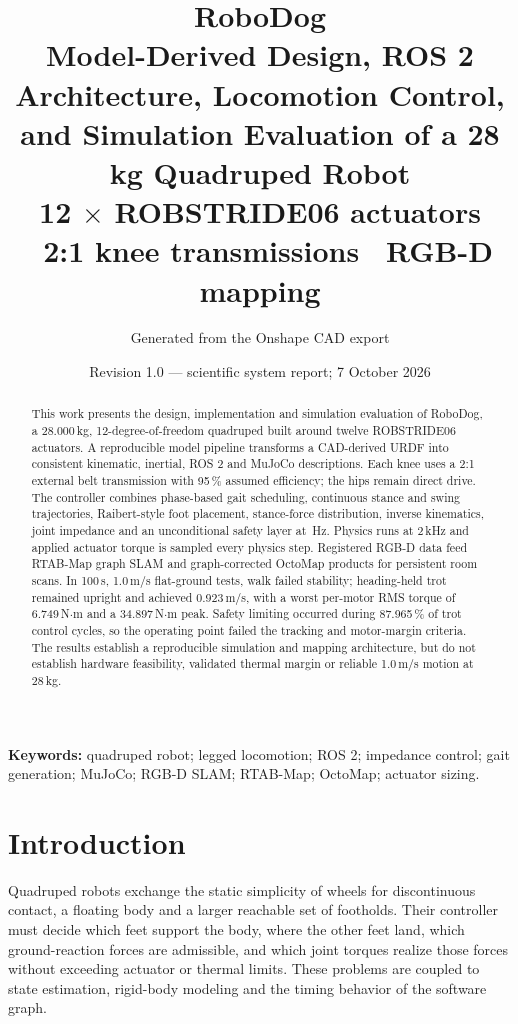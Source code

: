 \documentclass[11pt,a4paper]{article}
\title{\vspace{-12mm}\textbf{RoboDog}\\[2mm]
\large Model-Derived Design, ROS 2 Architecture, Locomotion Control,\\
and Simulation Evaluation of a 28 kg Quadruped Robot\\[1mm]
\normalsize 12 $\times$ ROBSTRIDE06 actuators \textbullet\ 2:1 knee transmissions
\textbullet\ RGB-D mapping}
\author{\small Generated from the Onshape CAD export \texttt{\RdCadSha}}
\date{\small Revision 1.0 --- scientific system report; 7 October 2026}
\begin{document}
\maketitle
\vspace{-6mm}

\begin{abstract}\noindent\small
This work presents the design, implementation and simulation evaluation of
RoboDog, a 28.000\,kg, 12-degree-of-freedom quadruped built around twelve
ROBSTRIDE06 actuators. A reproducible model pipeline transforms a CAD-derived
URDF into consistent kinematic, inertial, ROS 2 and MuJoCo descriptions. Each
knee uses a 2:1 external belt transmission with 95\,\% assumed efficiency; the
hips remain direct drive. The controller combines phase-based gait scheduling,
continuous stance and swing trajectories, Raibert-style foot placement,
stance-force distribution, inverse kinematics, joint impedance and an
unconditional safety layer at \RdControlRate\,Hz. Physics runs at 2\,kHz and
applied actuator torque is sampled every physics step. Registered RGB-D data
feed RTAB-Map graph SLAM and graph-corrected OctoMap products for persistent
room scans. In 100\,s, 1.0\,m/s flat-ground tests, walk failed stability;
heading-held trot remained upright and achieved 0.923\,m/s, with a worst
per-motor RMS torque of 6.749\,N$\cdot$m and a 34.897\,N$\cdot$m peak. Safety
limiting occurred during 87.965\,\% of trot control cycles, so the operating
point failed the tracking and motor-margin criteria. The results establish a
reproducible simulation and mapping architecture, but do not establish
hardware feasibility, validated thermal margin or reliable 1.0\,m/s motion at
28\,kg.
\end{abstract}

\noindent\textbf{Keywords:} quadruped robot; legged locomotion; ROS 2;
impedance control; gait generation; MuJoCo; RGB-D SLAM; RTAB-Map; OctoMap;
actuator sizing.

\vspace{-2mm}
\tableofcontents
\vspace{4mm}

\section{Introduction}
\label{sec:introduction}

Quadruped robots exchange the static simplicity of wheels for discontinuous
contact, a floating body and a larger reachable set of footholds. Their
controller must decide which feet support the body, where the other feet land,
which ground-reaction forces are admissible, and which joint torques realize
those forces without exceeding actuator or thermal limits. These problems are
coupled to state estimation, rigid-body modeling and the timing behavior of the
software graph.
\end{document}
